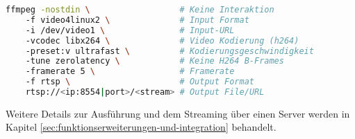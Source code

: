 \begin{lstlisting}[language=Bash]
ffmpeg -nostdin \                  # Keine Interaktion
    -f video4linux2 \              # Input Format
    -i /dev/video1 \               # Input-URL
    -vcodec libx264 \              # Video Kodierung (h264)
    -preset:v ultrafast \          # Kodierungsgeschwindigkeit
    -tune zerolatency \            # Keine H264 B-Frames
    -framerate 5 \                 # Framerate
    -f rtsp \                      # Output Format
    rtsp://<ip:8554|port>/<stream> # Output File/URL
\end{lstlisting}

Weitere Details zur Ausführung und dem Streaming über einen Server werden in Kapitel \ref{sec:funktionserweiterungen-und-integration}
behandelt.
